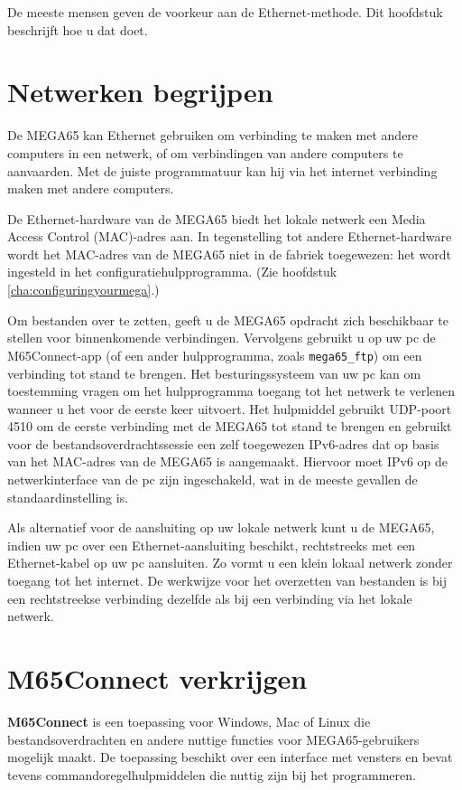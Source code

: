 De meeste mensen geven de voorkeur aan de Ethernet-methode. Dit hoofdstuk beschrijft hoe u dat doet.

\section{Netwerken begrijpen}

De MEGA65 kan Ethernet gebruiken om verbinding te maken met andere computers in een netwerk, of om verbindingen van andere computers te aanvaarden. Met de juiste programmatuur kan hij via het internet verbinding maken met andere computers.

De Ethernet-hardware van de MEGA65 biedt het lokale netwerk een Media Access Control (MAC)-adres aan. In tegenstelling tot andere Ethernet-hardware wordt het MAC-adres van de MEGA65 niet in de fabriek toegewezen: het wordt ingesteld in het configuratiehulpprogramma. (Zie hoofdstuk \vref{cha:configuringyourmega}.)

Om bestanden over te zetten, geeft u de MEGA65 opdracht zich beschikbaar te stellen voor binnenkomende verbindingen. Vervolgens gebruikt u op uw pc de M65Connect-app (of een ander hulpprogramma, zoals \texttt{mega65\_ftp}) om een verbinding tot stand te brengen. Het besturingssysteem van uw pc kan om toestemming vragen om het hulpprogramma toegang tot het netwerk te verlenen wanneer u het voor de eerste keer uitvoert. Het hulpmiddel gebruikt UDP-poort 4510 om de eerste verbinding met de MEGA65 tot stand te brengen en gebruikt voor de bestandsoverdrachtssessie een zelf toegewezen IPv6-adres dat op basis van het MAC-adres van de MEGA65 is aangemaakt. Hiervoor moet IPv6 op de netwerkinterface van de pc zijn ingeschakeld, wat in de meeste gevallen de standaardinstelling is.

Als alternatief voor de aansluiting op uw lokale netwerk kunt u de MEGA65, indien uw pc over een Ethernet-aansluiting beschikt, rechtstreeks met een Ethernet-kabel op uw pc aansluiten. Zo vormt u een klein lokaal netwerk zonder toegang tot het internet. De werkwijze voor het overzetten van bestanden is bij een rechtstreekse verbinding dezelfde als bij een verbinding via het lokale netwerk.

\section{M65Connect verkrijgen}

{\bf M65Connect} is een toepassing voor Windows, Mac of Linux die bestandsoverdrachten en andere nuttige functies voor MEGA65-gebruikers mogelijk maakt. De toepassing beschikt over een interface met vensters en bevat tevens commandoregelhulpmiddelen die nuttig zijn bij het programmeren.


